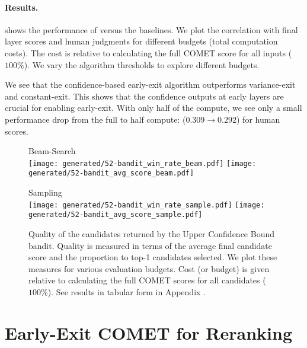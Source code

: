 \paragraph{Results.}

 shows the performance of  versus the baselines. We plot the correlation with final layer scores and human judgments for different budgets (total computation costs). The cost is relative to calculating the full COMET score for all inputs ($100\%$).
We vary the algorithm thresholds to explore different budgets.

We see that the confidence-based early-exit algorithm outperforms variance-exit and constant-exit.
This shows that the confidence outputs at early layers are crucial for enabling early-exit.
With only half of the compute, we see only a small performance drop from the full to half compute: ($0.309{\rightarrow}0.292$) for human scores.







\begin{figure*}[t]
    \centering
    Beam-Search\\
    \texttt{[image: generated/52-bandit\_win\_rate\_beam.pdf]}
    \hfill
    \texttt{[image: generated/52-bandit\_avg\_score\_beam.pdf]}
    
    Sampling\\
    \texttt{[image: generated/52-bandit\_win\_rate\_sample.pdf]}
    \hfill
    \texttt{[image: generated/52-bandit\_avg\_score\_sample.pdf]}

    \vspace{-2mm}
    \caption{Quality of the candidates returned by the Upper Confidence Bound bandit. Quality is measured in terms of the average final candidate score and the proportion to top-1 candidates selected. We plot these measures for various evaluation budgets. Cost (or budget) is given relative to calculating the full COMET scores for all candidates ($100\%$).
    See results in tabular form in Appendix .
    }
    \vspace{-2mm}
    \label{fig:bandit}
\end{figure*}


\section{Early-Exit COMET for Reranking}
\label{sec:goal_earlyexit2}

